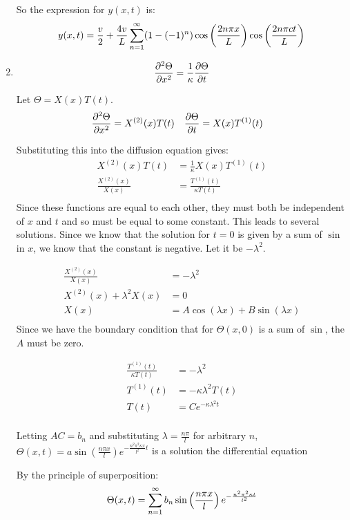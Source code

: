 \documentclass[10pt,oneside,a4paper]{article}
\begin{document}
\begin{enumerate}
So the expression for $y(x, t)$ is:
\[
y(x, t) = \frac{v}{2} + \frac{4v}{L}\sum^\infty_{n=1} (1 - (-1)^n)\cos\left(\frac{2n\pi x}{L}\right)\cos\left
(\frac{2n\pi ct}{L}\right) \\
\]

\item

\[
\pdv[2]{\Theta}{x} = \frac{1}{\kappa}\pdv{\Theta}{t} \\
\]

Let $\Theta = X(x)T(t)$.
\begin{align*}
\pdv[2]{\Theta}{x} &= X^{(2)}(x)T(t) & \pdv{\Theta}{t} &= X(x)T^{(1)}(t)
\end{align*}

Substituting this into the diffusion equation gives:
\[
\begin{split}
X^{(2)}(x)T(t) &= \frac{1}{\kappa} X(x)T^{(1)}(t) \\
\frac{X^{(2)}(x)}{X(x)} &= \frac{T^{(1)}(t)}{\kappa T(t)} \\
\end{split}
\]
Since these functions are equal to each other, they must both be independent of
$x$ and $t$ and so must be equal to some constant. This leads to several solutions.
Since we know that the solution for $t=0$ is given by a sum of $\sin$ in $x$, we know that
the constant is negative. Let it be $-\lambda^2$.

\[
\begin{split}
\frac{X^{(2)}(x)}{X(x)} &= -\lambda^2 \\
X^{(2)}(x) + \lambda^{2}X(x) &= 0 \\
X(x) &= A\cos(\lambda x) + B\sin(\lambda x) \\
\end{split}
\]
Since we have the boundary condition that for $\Theta(x, 0)$ is a sum of $\sin$,
the $A$ must be zero.

\[
\begin{split}
\frac{T^{(1)}(t)}{\kappa T(t)} &= -\lambda^2 \\
T^{(1)}(t) &= - \kappa\lambda^{2}T(t) \\
T(t) &= Ce^{-\kappa\lambda^2 t} \\
\end{split}
\]

Letting $AC = b_n$ and substituting $\lambda = \frac{n\pi}{l}$ for arbitrary $n$, $\Theta(x, t) = a \sin\left(\frac{n\pi x}{l}\right)
e^{-\frac{n^2\pi^2 \kappa x}{l^2} t} $ is a solution
the differential equation

By the principle of superposition:
\[
\Theta(x, t) = \sum^{\infty}_{n=1} b_n \sin\left( \frac{n\pi x}{l} \right)e^{-\frac{n^2\pi^2 \kappa t}{l^2}} \\
\]


\end{enumerate}
\end{document}
